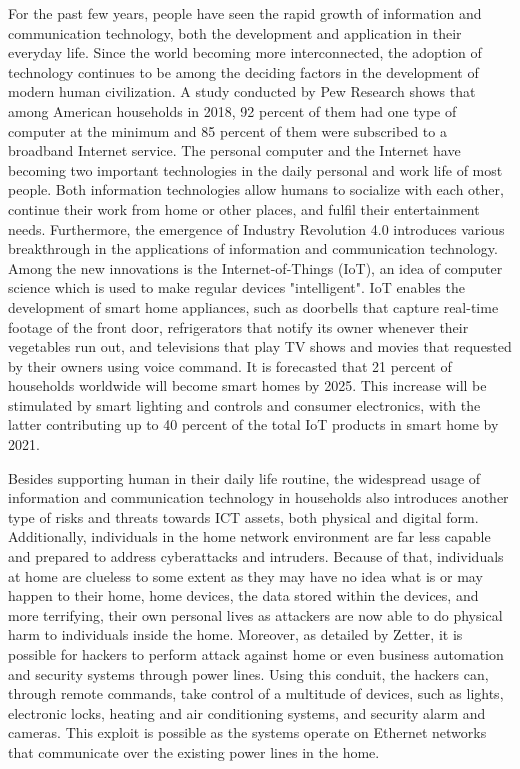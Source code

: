 \documentclass[../index.tex]{subfiles}
\begin{document}
For the past few years, people have seen the rapid growth of information and communication
technology, both the development and application in their everyday life. Since the world becoming
more interconnected, the adoption of technology continues to be among the deciding factors in the
development of modern human civilization. A study conducted by Pew Research shows that among
American households in 2018, 92 percent of them had one type of computer at the minimum and 85
percent of them were subscribed to a broadband Internet service. The personal computer and the
Internet have becoming two important technologies in the daily personal and work life of most
people. Both information technologies allow humans to socialize with each other, continue their work
from home or other places, and fulfil their entertainment needs. Furthermore, the emergence of
Industry Revolution 4.0 introduces various breakthrough in the applications of information and
communication technology. Among the new innovations is the Internet-of-Things (IoT), an idea of
computer science which is used to make regular devices "intelligent". IoT enables the development of
smart home appliances, such as doorbells that capture real-time footage of the front door,
refrigerators that notify its owner whenever their vegetables run out, and televisions that play TV
shows and movies that requested by their owners using voice command. It is forecasted that 21
percent of households worldwide will become smart homes by 2025. This increase will be stimulated by
smart lighting and controls and consumer electronics, with the latter contributing up to 40 percent
of the total IoT products in smart home by 2021.

Besides supporting human in their daily life routine, the widespread usage of information and
communication technology in households also introduces another type of risks and threats towards ICT
assets, both physical and digital form. Additionally, individuals in the home network environment
are far less capable and prepared to address cyberattacks and intruders. Because of that,
individuals at home are clueless to some extent as they may have no idea what is or may happen to
their home, home devices, the data stored within the devices, and more terrifying, their own
personal lives as attackers are now able to do physical harm to individuals inside the home.
Moreover, as detailed by Zetter, it is possible for hackers to perform attack against home or even
business automation and security systems through power lines. Using this conduit, the hackers can,
through remote commands, take control of a multitude of devices, such as lights, electronic locks,
heating and air conditioning systems, and security alarm and cameras. This exploit is possible as
the systems operate on Ethernet networks that communicate over the existing power lines in the home.
\end{document}
